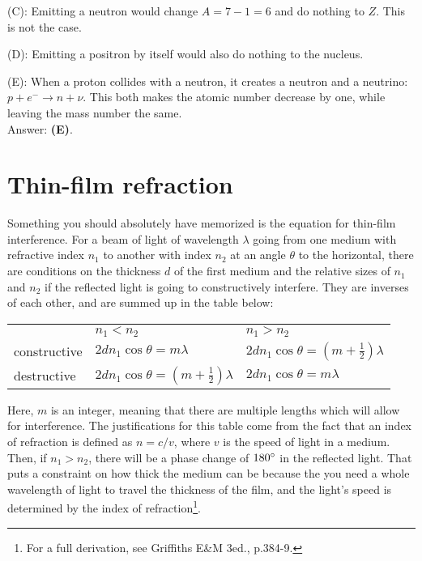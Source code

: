 \documentclass[11pt]{paper}
\newcommand{\answer}[1]{Answer: \textbf{(#1)}.}
\begin{document}
(C): Emitting a neutron would change $A = 7-1=6$ and do nothing to $Z$.  This is not the case.

(D): Emitting a positron by itself would also do nothing to the nucleus.

(E): When a proton collides with a neutron, it creates a neutron and a neutrino: $p + e^- \rightarrow n + \nu$.  This both makes the atomic number decrease by one, while leaving the mass number the same.\\

\answer{E} 

\section{Thin-film refraction}
Something you should absolutely have memorized is the equation for thin-film interference.  For a beam of light of wavelength $\lambda$ going from one medium with refractive index $n_1$ to another with index $n_2$ at an angle $\theta$ to the horizontal, there are conditions on the thickness $d$ of the first medium and the relative sizes of $n_1$ and $n_2$ if the reflected light is going to constructively interfere.  They are inverses of each other, and are summed up in the table below:
\begin{table}[h]
\centering
\bgroup
\def\arraystretch{1.5}
\begin{tabular}{lll}
                                  & $n_1<n_2$  & $n_1>n_2$     \\ \cline{2-3} 
\multicolumn{1}{l|}{constructive} & \multicolumn{1}{l|}{$2dn_1\cos{\theta} = m\lambda$} & \multicolumn{1}{l|}{$2dn_1\cos{\theta} = \left(m+\frac{1}{2}\right)\lambda$} \\ \cline{2-3} 
\multicolumn{1}{l|}{destructive}  & \multicolumn{1}{l|}{$2dn_1\cos{\theta} = \left(m+\frac{1}{2}\right)\lambda$} & \multicolumn{1}{l|}{$2dn_1\cos{\theta} = m\lambda$} \\ \cline{2-3} 
\end{tabular}
\egroup
\end{table}

Here, $m$ is an integer, meaning that there are multiple lengths which will allow for interference.  The justifications for this table come from the fact that an index of refraction is defined as $n=c/v$, where $v$ is the speed of light in a medium.  Then, if $n_1>n_2$, there will be a phase change of $180\degree$ in the reflected light.  That puts a constraint on how thick the medium can be because the you need a whole wavelength of light to travel the thickness of the film, and the light's speed is determined by the index of refraction\footnote{For a full derivation, see Griffiths E\&M 3ed., p.384-9.}.
\end{document}
